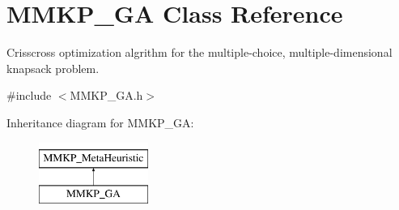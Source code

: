 \hypertarget{class_m_m_k_p___g_a}{\section{M\+M\+K\+P\+\_\+\+G\+A Class Reference}
\label{class_m_m_k_p___g_a}
}


Crisscross optimization algrithm for the multiple-\/choice, multiple-\/dimensional knapsack problem.  




{\ttfamily \#include $<$M\+M\+K\+P\+\_\+\+G\+A.\+h$>$}

Inheritance diagram for M\+M\+K\+P\+\_\+\+G\+A\+:\begin{figure}[H]
\begin{center}
\leavevmode
\includegraphics[height=2.000000cm]{class_m_m_k_p___g_a}
\end{center}
\end{figure}
